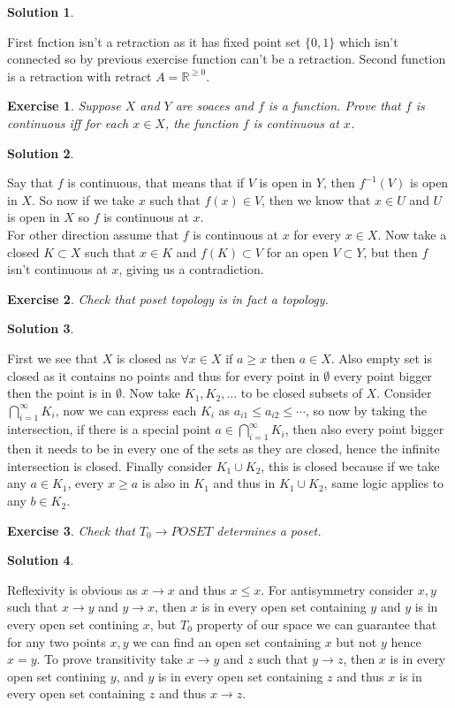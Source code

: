 \documentclass[11pt,a4paper]{article}
\newtheorem{Ex}{Exercise}
\newtheorem{Sol}{Solution}
\newcommand{\R}{\mathbb{R}}
\newcommand{\ra}{\rightarrow}
\begin{document}
\begin{Sol}
\end{Sol}
\noindent First fnction isn't a retraction as it has fixed point set $\{0,1\}$ which isn't connected so by previous exercise function can't be a retraction. Second function is a retraction with retract $A = \R^{\ge 0}$.


\begin{Ex}
	Suppose $X$ and $Y$ are soaces and $f$ is a function. Prove that $f$ is continuous iff for each $x\in X$, the function $f$ is continuous at $x$.
\end{Ex}

\begin{Sol}\end{Sol}
\noindent Say that $f$ is continuous, that means that if $V$ is open in $Y$, then $f^{-1}(V)$ is open in $X$. So now if we take $x$ such that $f(x) \in V$, then we know that $x \in U$ and $U$ is open in $X$ so $f$ is continuous at $x$. \\
\noindent For other direction assume that $f$ is continuous at $x$ for every $x\in X$. Now take a closed $K \subset X$ such that $x\in K$ and $f(K) \subset V$ for an open $V \subset Y$, but then $f$ isn't continuous at $x$, giving us a contradiction. \\

\begin{Ex}
	Check that poset topology is in fact a topology.
\end{Ex}
\begin{Sol}
\end{Sol}
\noindent First we see that $X$ is closed as $\forall x\in X$ if $a\ge x$ then $a \in X$. Also empty set is closed as it contains no points and thus for every point in $\emptyset$ every point bigger then the point is in $\emptyset$. Now take $K_1, K_2, \dots$ to be closed subsets of $X$. Consider $\bigcap_{i=1}^{\infty}K_i$, now we can express each $K_i$ as $a_{i1} \le a_{i2} \le \cdots$, so now by taking the intersection, if there is a special point $a \in \bigcap_{i=1}^{\infty}K_i$, then also every point bigger then it needs to be in every one of the sets as they are closed, hence the infinite intersection is closed. Finally consider $K_1 \cup K_2$, this is closed because if we take any $a \in K_1$, every $x\ge a$ is also in $K_1$ and thus in $K_1 \cup K_2$, same logic applies to any $b \in K_2$.

\begin{Ex}
	Check that $T_0 \ra POSET$ determines a poset.
\end{Ex}
\begin{Sol}
\end{Sol}
\noindent Reflexivity is obvious as $x \ra x$ and thus $x \le x$. For antisymmetry consider $x,y$ such that $x \ra  y$ and $y\ra x$, then $x$ is in every open set containing $y$ and $y$ is in every open set contining $x$, but $T_0$ property of our space we can guarantee that for any two points $x,y$ we can find an open set containing $x$ but not $y$ hence $x = y$. To prove transitivity take $x \ra y$ and $z$ such that $y \ra z$, then $x$ is in every open set contining $y$, and $y$ is in every open set containing $z$ and thus $x$ is in every open set containing $z$ and thus $x\ra z$.
\end{document}
